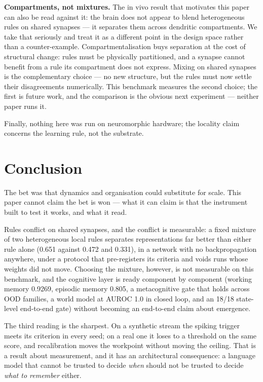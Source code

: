 \documentclass[11pt]{article}
\begin{document}
\textbf{Compartments, not mixtures.} The in vivo result that motivates this paper
\citep{wright2025distinct} can also be read against it: the brain does not appear to blend
heterogeneous rules on shared synapses --- it separates them across dendritic compartments. We
take that seriously and treat it as a different point in the design space rather than a
counter-example. Compartmentalisation buys separation at the cost of structural change: rules must
be physically partitioned, and a synapse cannot benefit from a rule its compartment does not
express. Mixing on shared synapses is the complementary choice --- no new structure, but the rules
must now settle their disagreements numerically. This benchmark measures the second choice; the
first is future work, and the comparison is the obvious next experiment --- neither paper runs it.

Finally, nothing here was run on neuromorphic hardware; the locality claim concerns the learning
rule, not the substrate.

\section{Conclusion}

The bet was that dynamics and organisation could substitute for scale. This paper
cannot claim the bet is won --- what it can claim is that the instrument built to
test it works, and what it read.

Rules conflict on shared synapses, and the conflict is measurable: a fixed mixture of
two heterogeneous local rules separates representations far better than either rule
alone (0.651 against 0.472 and 0.331), in a network with no backpropagation anywhere,
under a protocol that pre-registers its criteria and voids runs whose weights did not
move. Choosing the mixture, however, is not measurable on this benchmark, and the
cognitive layer is ready component by component (working memory 0.9269, episodic
memory 0.805, a metacognitive gate that holds across OOD families, a world model at
AUROC 1.0 in closed loop, and an 18/18 state-level end-to-end gate) without becoming
an end-to-end claim about emergence.

The third reading is the sharpest. On a synthetic stream the spiking trigger meets
its criterion in every seed; on a real one it loses to a threshold on the same score,
and recalibration moves the workpoint without moving the ceiling. That is a result
about measurement, and it has an architectural consequence: a language model that
cannot be trusted to decide \emph{when} should not be trusted to decide \emph{what to
remember} either.
\end{document}
